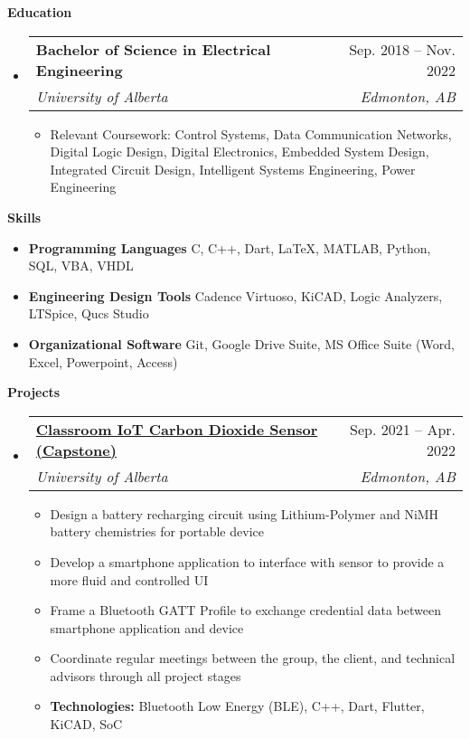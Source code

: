 \documentclass[letterpaper,12pt]{article}[leftmargin=*]
\makeatletter
\def \entryspacing {-0pt}
\renewcommand{\section}[2]{\vspace{5pt}
  \colorbox{secondary}{\color{white}\raggedbottom\normalsize\textbf{{#1}{\hspace{7pt}#2}}}
}
\newcommand{\resumeEntryStart}{\begin{itemize}[leftmargin=2.5mm]}
\newcommand{\resumeEntryEnd}{\end{itemize}\vspace{\entryspacing}}
\newcommand{\resumeItemListStart}{\begin{itemize}[leftmargin=4.5mm]}
\newcommand{\resumeItemListEnd}{\end{itemize}}
\newcommand{\resumeItem}[1]{
  \item\small{
    {#1 \vspace{-2pt}}
  }
}
\newcommand{\resumeEntryTSDL}[4]{
  \vspace{-1pt}\item[]
    \begin{tabularx}{0.97\textwidth}{X@{\hspace{60pt}}r}
      \textbf{\color{primary}#1} & {\firabook\color{accent}\small#2} \\
      \textit{\color{accent}\small#3} & \textit{\color{accent}\small#4} \\
    \end{tabularx}\vspace{-6pt}
}
\newcommand{\resumeEntryS}[2]{
  \item[]\small{
    \textbf{\color{primary}#1 }{ #2 \vspace{-6pt}}
  }
}
\makeatother
\begin{document}
\section{\faGraduationCap}{Education}

  \resumeEntryStart
    \resumeEntryTSDL
      {Bachelor of Science in Electrical Engineering}{Sep. 2018 -- Nov. 2022}
      {University of Alberta}{Edmonton, AB}
  \resumeItemListStart
    \resumeItem{Relevant Coursework: Control Systems, Data Communication Networks, Digital Logic Design, Digital Electronics, Embedded System Design, Integrated Circuit Design, Intelligent Systems Engineering, Power Engineering}
  \resumeItemListEnd
  \resumeEntryEnd

\section{\faGears}{Skills}

  \resumeEntryStart
   \resumeEntryS{Programming Languages } {C, C++, Dart, LaTeX, MATLAB, Python, SQL, VBA, VHDL}
   \resumeEntryS{Engineering Design Tools } {Cadence Virtuoso, KiCAD, Logic Analyzers, LTSpice, Qucs Studio}
   \resumeEntryS{Organizational Software } {Git, Google Drive Suite, MS Office Suite (Word, Excel, Powerpoint, Access)}
  \resumeEntryEnd

\section{\faFlask}{Projects}

  \resumeEntryStart
    \resumeEntryTSDL
      {\href{https://github.com/EE-Team10-Capstone}{\color{black}Classroom IoT Carbon Dioxide Sensor (Capstone)}}{Sep. 2021 -- Apr. 2022}
      {University of Alberta}{Edmonton, AB}
    \resumeItemListStart
      \resumeItem {Design a battery recharging circuit using Lithium-Polymer and NiMH battery chemistries for portable device}
      \resumeItem {Develop a smartphone application to interface with sensor to provide a more fluid and controlled UI}
      \resumeItem {Frame a Bluetooth GATT Profile to exchange credential data between smartphone application and device}
      \resumeItem {Coordinate regular meetings between the group, the client, and technical advisors through all project stages}
      \resumeItem {\textbf{Technologies:} Bluetooth Low Energy (BLE), C++, Dart, Flutter, KiCAD, SoC}
    \resumeItemListEnd
  \resumeEntryEnd
\end{document}
